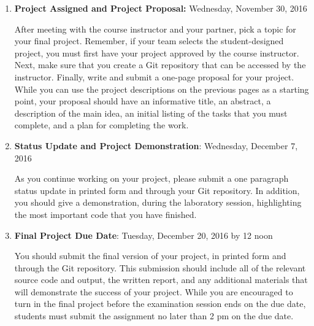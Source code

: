 \vspace*{-.1in}
\begin{enumerate}

  \itemsep0in

  \item {\bf Project Assigned and Project Proposal:} Wednesday, November 30, 2016

    After meeting with the course instructor and your partner, pick a topic for your final project.  Remember, if your
    team selects the student-designed project, you must first have your project approved by the course instructor.
    Next, make sure that you create a Git repository that can be accessed by the instructor. Finally, write and submit a
    one-page proposal for your project. While you can use the project descriptions on the previous pages as a starting
    point, your proposal should have an informative title, an abstract, a description of the main idea, an initial
    listing of the tasks that you must complete, and a plan for completing the work.

  \item {\bf Status Update and Project Demonstration}: Wednesday, December 7, 2016

    As you continue working on your project, please submit a one paragraph status update in printed form and through
    your Git repository. In addition, you should give a demonstration, during the laboratory session, highlighting the
    most important code that you have finished.

  \item {\bf Final Project Due Date}: Tuesday, December 20, 2016 by 12 noon

    You should submit the final version of your project, in printed form and through the Git repository. This submission
    should include all of the relevant source code and output, the written report, and any additional materials that
    will demonstrate the success of your project.  While you are encouraged to turn in the final project before the
    examination session ends on the due date, students must submit the assignment no later than 2 pm on the due date.

\end{enumerate}
\vspace*{-.1in}



